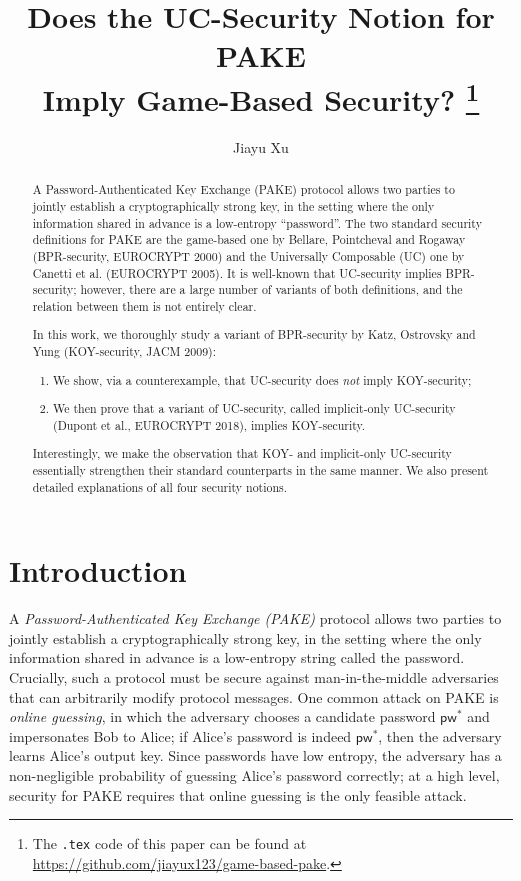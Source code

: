 \documentclass{article}
\newcommand{\pw}{\mathsf{pw}}
\begin{document}
\title{Does the UC-Security Notion for PAKE \\ Imply Game-Based Security?
\thanks{The \texttt{.tex} code of this paper can be found at \url{https://github.com/jiayux123/game-based-pake}.}
}

\author{Jiayu Xu}
\date{}

\maketitle

\begin{abstract}
A Password-Authenticated Key Exchange (PAKE) protocol allows two parties to jointly establish a cryptographically strong key, in the setting where the only information shared in advance is a low-entropy ``password''. The two standard security definitions for PAKE are the game-based one by Bellare, Pointcheval and Rogaway (BPR-security, EUROCRYPT 2000) and the Universally Composable (UC) one by Canetti et al. (EUROCRYPT 2005). It is well-known that UC-security implies BPR-security; however, there are a large number of variants of both definitions, and the relation between them is not entirely clear.

In this work, we thoroughly study a variant of BPR-security by Katz, Ostrovsky and Yung (KOY-security, JACM 2009):
\begin{enumerate}
  \item We show, via a counterexample, that UC-security does \emph{not} imply KOY-security;
  \item We then prove that a variant of UC-security, called implicit-only UC-security (Dupont et al., EUROCRYPT 2018), implies KOY-security.
\end{enumerate}
Interestingly, we make the observation that KOY- and implicit-only UC-security essentially strengthen their standard counterparts in the same manner. We also present detailed explanations of all four security notions.
\end{abstract}
\section{Introduction}
A \emph{Password-Authenticated Key Exchange (PAKE)} protocol allows two parties to jointly establish a cryptographically strong key, in the setting where the only information shared in advance is a low-entropy string called the password. Crucially, such a protocol must be secure against man-in-the-middle adversaries that can arbitrarily modify protocol messages. One common attack on PAKE is \emph{online guessing}, in which the adversary chooses a candidate password $\pw^*$ and impersonates Bob to Alice; if Alice's password is indeed $\pw^*$, then the adversary learns Alice's output key. Since passwords have low entropy, the adversary has a non-negligible probability of guessing Alice's password correctly; at a high level, security for PAKE requires that online guessing is the only feasible attack.
\end{document}
